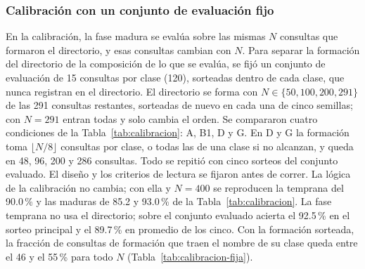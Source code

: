 \subsubsection{Calibración con un conjunto de evaluación fijo}
\label{sec:calibracion-fija}

En la calibración, la fase madura se evalúa sobre las mismas $N$ consultas que formaron
el directorio, y esas consultas cambian con $N$.
Para separar la formación del directorio de la composición de lo que se evalúa, se fijó
un conjunto de evaluación de 15 consultas por clase (120), sorteadas dentro de cada
clase, que nunca registran en el directorio.
El directorio se forma con $N \in \{50, 100, 200, 291\}$ de las 291 consultas
restantes, sorteadas de nuevo en cada una de cinco semillas; con $N = 291$ entran todas y
solo cambia el orden.
Se compararon cuatro condiciones de la Tabla~\ref{tab:calibracion}: A, B1, D y G.
En D y G la formación toma $\lfloor N/8 \rfloor$ consultas por clase, o todas las de una
clase si no alcanzan, y queda en 48, 96, 200 y 286 consultas.
Todo se repitió con cinco sorteos del conjunto evaluado.
El diseño y los criterios de lectura se fijaron antes de correr.
La lógica de la calibración no cambia; con ella y $N = 400$ se reproducen la temprana
del 90.0\,\% y las maduras de 85.2 y 93.0\,\% de la Tabla~\ref{tab:calibracion}.
La fase temprana no usa el directorio; sobre el conjunto evaluado acierta el 92.5\,\% en
el sorteo principal y el 89.7\,\% en promedio de los cinco.
Con la formación sorteada, la fracción de consultas de formación que traen el nombre de
su clase queda entre el 46 y el 55\,\% para todo $N$
(Tabla~\ref{tab:calibracion-fija}).

